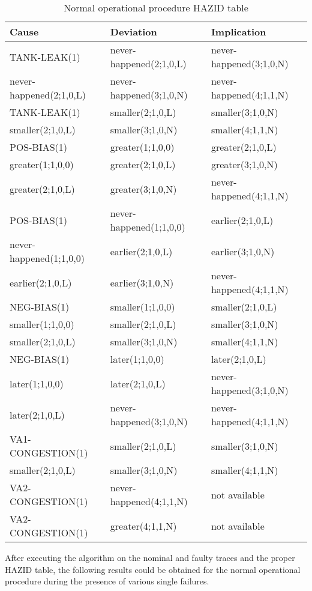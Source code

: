 \documentclass[conference]{IEEEtran}
\begin{document}
\begin{table}
\label{tab:normalophazid}
\begin{tabular}{|l|l|l|}
\hline
Cause & Deviation & Implication \\
\hline
TANK-LEAK(1) & never-happened(2;1,0,L) & never-happened(3;1,0,N) \\
never-happened(2;1,0,L) & never-happened(3;1,0,N) & never-happened(4;1,1,N) \\
TANK-LEAK(1) & smaller(2;1,0,L) & smaller(3;1,0,N) \\
smaller(2;1,0,L) & smaller(3;1,0,N) & smaller(4;1,1,N) \\
POS-BIAS(1) & greater(1;1,0,0) & greater(2;1,0,L) \\
greater(1;1,0,0) & greater(2;1,0,L) & greater(3;1,0,N) \\
greater(2;1,0,L) & greater(3;1,0,N) & never-happened(4;1,1,N) \\
POS-BIAS(1) & never-happened(1;1,0,0) & earlier(2;1,0,L) \\
never-happened(1;1,0,0) & earlier(2;1,0,L) & earlier(3;1,0,N) \\
earlier(2;1,0,L) & earlier(3;1,0,N) & never-happened(4;1,1,N) \\
NEG-BIAS(1) & smaller(1;1,0,0) & smaller(2;1,0,L) \\
smaller(1;1,0,0) & smaller(2;1,0,L) & smaller(3;1,0,N) \\
smaller(2;1,0,L) & smaller(3;1,0,N) & smaller(4;1,1,N) \\
NEG-BIAS(1) & later(1;1,0,0) & later(2;1,0,L) \\
later(1;1,0,0) & later(2;1,0,L) & never-happened(3;1,0,N) \\
later(2;1,0,L) & never-happened(3;1,0,N) & never-happened(4;1,1,N) \\
VA1-CONGESTION(1) & smaller(2;1,0,L) & smaller(3;1,0,N) \\
smaller(2;1,0,L) & smaller(3;1,0,N) & smaller(4;1,1,N) \\
VA2-CONGESTION(1) & never-happened(4;1,1,N) & not available \\
VA2-CONGESTION(1) & greater(4;1,1,N) & not available \\
\hline
\end{tabular}
\caption{Normal operational procedure HAZID table}
\end{table}

After executing the algorithm on the nominal and faulty traces and the proper HAZID table, the following results could be obtained for the normal operational procedure during the presence of various single failures.
\end{document}
